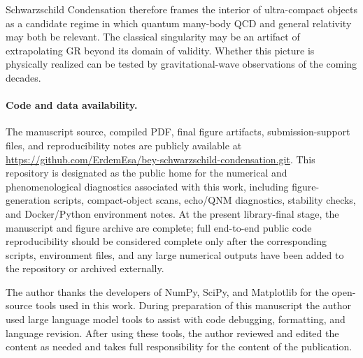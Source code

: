 \documentclass[epj]{svjour}
\begin{document}
Schwarzschild Condensation therefore frames the interior of ultra-compact
objects as a candidate regime in which quantum many-body QCD and general
relativity may both be relevant. The classical singularity
may be an artifact of extrapolating GR beyond its domain of validity. Whether
this picture is physically realized can be tested by gravitational-wave
observations of the coming decades.

\paragraph{Code and data availability.}
The manuscript source, compiled PDF, final figure artifacts, submission-support files, and reproducibility notes are publicly available at
\url{https://github.com/ErdemEsa/bey-schwarzschild-condensation.git}. This repository is designated as the public home for the numerical and phenomenological diagnostics associated with this work, including figure-generation scripts, compact-object scans, echo/QNM diagnostics, stability checks, and Docker/Python environment notes. At the present library-final stage, the manuscript and figure archive are complete; full end-to-end public code reproducibility should be considered complete only after the corresponding scripts, environment files, and any large numerical outputs have been added to the repository or archived externally.

\begin{acknowledgement}
The author thanks the developers of NumPy, SciPy, and Matplotlib for the open-source tools used in this work. During preparation of this manuscript the author used large language model tools to assist with code debugging, formatting, and language revision. After using these tools, the author reviewed and edited the content as needed and takes full responsibility for the content of the publication.
\end{acknowledgement}
\end{document}
